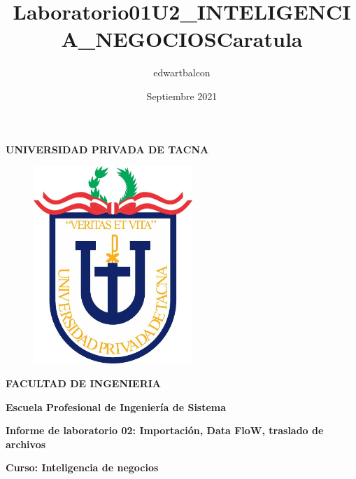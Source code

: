 \documentclass{article}
\title{Laboratorio01U2_INTELIGENCIA_NEGOCIOS}
\author{edwartbalcon}
\date{Septiembre 2021}
\begin{document}
\title{Caratula}

\begin{titlepage}
\begin{center}
\begin{Large}
\textbf{UNIVERSIDAD PRIVADA DE TACNA} \\
\end{Large}
\vspace*{-0.025in}
\begin{figure}[htb]
\begin{center}
\includegraphics[width=6cm]{./images/logo_UPT}
\end{center}
\end{figure}
\vspace*{-0.025in}
\begin{Large}
\textbf{FACULTAD DE INGENIERIA} \\
\end{Large}
\vspace*{0.05in}
\begin{Large}
\textbf{Escuela Profesional de Ingeniería de Sistema} \\
\end{Large}


\vspace*{0.4in}

\vspace*{0.1in}
\begin{Large}
\textbf{Informe de laboratorio 02: Importación, Data FloW, traslado de archivos} \\
\end{Large}

\vspace*{0.3in}
\begin{Large}
\textbf{Curso: Inteligencia de negocios} \\
\end{Large}


\end{center}
\end{titlepage}
\end{document}
